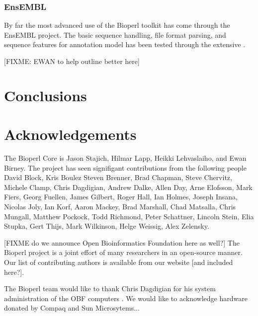 \documentclass{article}
\begin{document}
\begin{twocolumn}
\begin{itemize}
\end{itemize}

\subsubsection{EnsEMBL}

By far the most advanced use of the Bioperl toolkit has come through
the EnsEMBL project.  The basic sequence handling, file format
parsing, and sequence features for annotation model has been tested
through the extensive .

[FIXME: EWAN to help outline better here]


\section{Conclusions}

\section{Acknowledgements}

The Bioperl Core is Jason Stajich, Hilmar Lapp, Heikki Lehvaslaiho,
and Ewan Birney.  The project has seen signifigant
contributions from the following people David Block, Kris Boulez
Steven Brenner, Brad Chapman, Steve Chervitz, Michele Clamp, Chris
Dagdigian, Andrew Dalke, Allen Day, Arne Elofsson, Mark Fiers, Georg
Fuellen, James Gilbert, Roger Hall, Ian Holmes, Joseph Insana, Nicolas
Joly, Ian Korf, Aaron Mackey, Brad Marshall, Chad Matsalla, Chris
Mungall, Matthew Pockock, Todd Richmond, Peter Schattner, Lincoln
Stein, Elia Stupka, Gert Thijs, Mark Wilkinson, Helge Weissig, Alex
Zelensky.

 
[FIXME do we announce Open Bioinformatics Foundation here as well?]
The Bioperl project is a joint effort of many researchers in an
open-source manner.  Our list of contributing authors is available
from our website [and included here?]. 

The Bioperl team would like to thank Chris Dagdigian for his system
administration of the OBF computers .  We would like to acknowledge
hardware donated by Compaq and Sun Microsytems...


 

\end{twocolumn}
\end{document}
